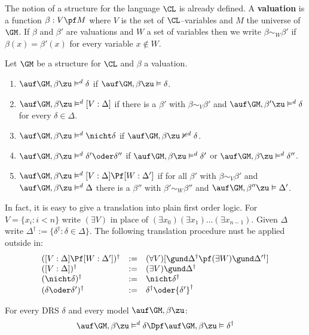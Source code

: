 The notion of a structure for the language $\CL$ is already
defined. A {\bf valuation} is a function $\beta : V \pf M$
where $V$ is the set of $\CL$--variables and $M$ the
universe of $\GM$. If $\beta$ and $\beta'$ are valuations
and $W$ a set of variables then we write $\beta \sim_W \beta'$
if $\beta(x) = \beta'(x)$ for every variable $x \not\in W$.
\begin{defn}
Let $\GM$ be a structure for $\CL$ and $\beta$ a valuation.
\begin{enumerate}
\item
$\auf \GM, \beta\zu \vDash^d \delta$ if
    $\auf \GM, \beta\zu \vDash \delta$.
\item
$\auf \GM, \beta\zu \vDash^d [V : \Delta]$ if there is a $\beta'$
    with $\beta \sim_V \beta'$ and
    $\auf \GM, \beta'\zu \vDash^d \delta$ for every
    $\delta \in \Delta$.
\item
$\auf \GM, \beta\zu \vDash^d \nicht \delta$ if 
    $\auf \GM, \beta\zu \nvDash^d \delta$.
\item
$\auf \GM, \beta\zu \vDash^d \delta' \oder \delta''$ if
    $\auf \GM, \beta\zu \vDash^d \delta'$ or
    $\auf \GM, \beta\zu \vDash^d \delta''$.
\item
$\auf \GM, \beta\zu \vDash^d [V : \Delta] \Pf [W : \Delta']$ if
    for all $\beta'$ with $\beta \sim_V \beta'$
    and $\auf \GM, \beta\zu \vDash^d \Delta$ there is a
    $\beta''$ with $\beta' \sim_W \beta''$
    and $\auf \GM, \beta''\zu \vDash \Delta'$.
\end{enumerate}
\end{defn}
In fact, it is easy to give a translation into plain first order
logic. For $V = \{x_i : i < n\}$ write $(\exists V)$
in place of $(\exists x_0)(\exists x_1)\ldots (\exists x_{n-1})$.
Given $\Delta$ write $\Delta^{\dagger} :=
\{\delta^{\dagger} : \delta \in \Delta\}$. The following
translation procedure nust be applied outside in:
$$\begin{array}{l@{\quad := \quad}l}
([V : \Delta] \Pf [W : \Delta'])^{\dagger} &
    (\forall V)[\gund \Delta^{\dagger} \pf (\exists W)\gund
    \Delta'^{\dagger}] \\
([V : \Delta])^{\dagger} & (\exists V)\gund \Delta^{\dagger} \\
(\nicht \delta)^{\dagger} & \nicht \delta^{\dagger} \\
(\delta \oder \delta')^{\dagger} & \delta^{\dagger} \oder
    {\delta'}^{\dagger}
\end{array}$$
\begin{prop}
\label{prop:drtfol}
For every DRS $\delta$ and every mo\-del $\auf \GM, \beta\zu$:
$$\auf \GM, \beta\zu \vDash^d \delta \Dpf
\auf \GM, \beta\zu\vDash \delta^{\dagger}$$
\end{prop}
